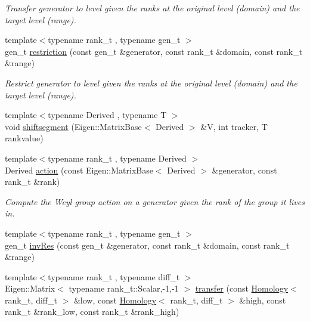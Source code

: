 \begin{DoxyCompactItemize}
\begin{DoxyCompactList}\small\item\em Transfer generator to level given the ranks at the original level (domain) and the target level (range). \end{DoxyCompactList}\item 
{\footnotesize template$<$typename rank\+\_\+t , typename gen\+\_\+t $>$ }\\gen\+\_\+t \hyperlink{namespaceMackey_ad1e907ff76b07d4fc4c9d4bdf25918bd}{restriction} (const gen\+\_\+t \&generator, const rank\+\_\+t \&domain, const rank\+\_\+t \&range)
\begin{DoxyCompactList}\small\item\em Restrict generator to level given the ranks at the original level (domain) and the target level (range). \end{DoxyCompactList}\item 
{\footnotesize template$<$typename Derived , typename T $>$ }\\void \hyperlink{namespaceMackey_aab8a6292210a3b71960cb03b79d218e6}{shiftsegment} (Eigen\+::\+Matrix\+Base$<$ Derived $>$ \&V, int tracker, T rankvalue)
\item 
{\footnotesize template$<$typename rank\+\_\+t , typename Derived $>$ }\\Derived \hyperlink{namespaceMackey_aa515b26c0fbc7f19b36cee7d826f07b9}{action} (const Eigen\+::\+Matrix\+Base$<$ Derived $>$ \&generator, const rank\+\_\+t \&rank)
\begin{DoxyCompactList}\small\item\em Compute the Weyl group action on a generator given the rank of the group it lives in. \end{DoxyCompactList}\item 
{\footnotesize template$<$typename rank\+\_\+t , typename gen\+\_\+t $>$ }\\gen\+\_\+t \hyperlink{namespaceMackey_a30b5667e411ff694aa989e95e394bb41}{inv\+Res} (const gen\+\_\+t \&generator, const rank\+\_\+t \&domain, const rank\+\_\+t \&range)
\item 
{\footnotesize template$<$typename rank\+\_\+t , typename diff\+\_\+t $>$ }\\Eigen\+::\+Matrix$<$ typename rank\+\_\+t\+::\+Scalar,-\/1,-\/1 $>$ \hyperlink{namespaceMackey_a3f20cf0ccf7d280f6a6e308c381dc350}{transfer} (const \hyperlink{classMackey_1_1Homology}{Homology}$<$ rank\+\_\+t, diff\+\_\+t $>$ \&low, const \hyperlink{classMackey_1_1Homology}{Homology}$<$ rank\+\_\+t, diff\+\_\+t $>$ \&high, const rank\+\_\+t \&rank\+\_\+low, const rank\+\_\+t \&rank\+\_\+high)

\end{DoxyCompactItemize}
